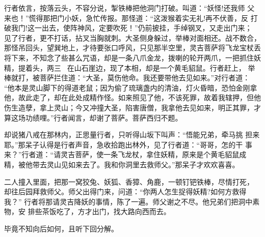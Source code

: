 行者依言，按落云头，不容分说，掣铁棒把他洞门打破。叫道：“妖怪!还我师
父来也！”慌得那把门小妖，急忙传报。那怪道：“这泼猴着实无礼!再不伏善，反
打破我门!这一出去，使阵神风，定要吹死！”仍前披挂，手绰钢叉，又走出门来；
见了行者，更不打话，拈叉当胸就刺。大圣侧身躲过，举棒对面相还。战不数合，
那怪吊回头，望巽地上，才待要张口呼风，只见那半空里，灵吉菩萨将飞龙宝杖丢
将下来，不知念了些甚么咒语，却是一条八爪金龙，拨喇的轮开两爪，一把抓住妖
精，提着头，两三，在山石崖边，现了本相，却是一个黄毛貂鼠。行者赶上，
举棒就打，被菩萨拦住道：“大圣，莫伤他命。我还要带他去见如来。”对行者道：
“他本是灵山脚下的得道老鼠；因为偷了琉璃盏内的清油，灯火昏暗，恐怕金刚拿
他，故此走了，却在此处成精作怪。如来照见了他，不该死罪，故着我辖押，但他
伤生造孽，拿上灵山；今又冲撞大圣，陷害唐僧，我拿他去见如来，明正其罪，才
算这场功绩哩。”行者闻言，却谢了菩萨。菩萨西归不题。

却说猪八戒在那林内，正思量行者，只听得山坂下叫声：“悟能兄弟，牵马挑
担来耶。”那呆子认得是行者声音，急收拾跑出林外，见了行者道：“哥哥，怎的干
事来？”行者道：“请灵吉菩萨，使一条飞龙杖，拿住妖精，原来是个黄毛貂鼠成
精，被他带去灵山见如来去了。我和你洞里去救师父。”那呆子才欢欢喜喜。

二人撞入里面，把那一窝狡兔、妖狐、香獐、角鹿，一顿钉钯铁棒，尽情打死，
却往后园拜救师父。师父出得门来，问道：“你两人怎生捉得妖精?如何方救得我？”
行者将那请灵吉降妖的事情，陈了一遍。师父谢之不尽。他兄弟们把洞中素物，安
排些茶饭吃了，方才出门，找大路向西而去。

毕竟不知向后如何，且听下回分解。
